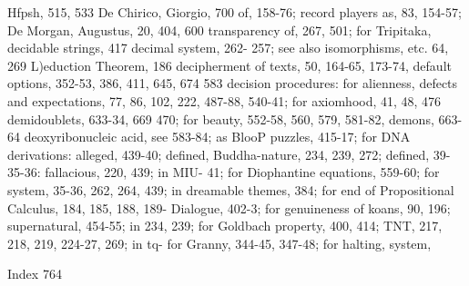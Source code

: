 Hfpsh, 515, 533 De Chirico, Giorgio, 700       of, 158-76; record players as, 83, 154-57;
De Morgan, Augustus, 20, 404, 600              transparency of, 267, 501; for Tripitaka,
decidable strings, 417 decimal system, 262-    257; see also isomorphisms, etc.
64, 269                                        L)eduction Theorem, 186
decipherment of texts, 50, 164-65, 173-74,     default options, 352-53, 386, 411, 645, 674
583 decision procedures: for alienness,        defects and expectations, 77, 86, 102, 222,
487-88, 540-41; for axiomhood, 41, 48,         476 demidoublets, 633-34, 669
470; for beauty, 552-58, 560, 579, 581-82,     demons, 663-64 deoxyribonucleic acid, see
583-84; as BlooP puzzles, 415-17; for          DNA derivations: alleged, 439-40; defined,
Buddha-nature, 234, 239, 272; defined, 39-     35-36: fallacious, 220, 439; in MIU-
41; for Diophantine equations, 559-60; for     system, 35-36, 262, 264, 439; in
dreamable themes, 384; for end of              Propositional Calculus, 184, 185, 188, 189-
Dialogue, 402-3; for genuineness of koans,     90, 196; supernatural, 454-55; in
234, 239; for Goldbach property, 400, 414;     TNT, 217, 218, 219, 224-27, 269; in tq-
for Granny, 344-45, 347-48; for halting,       system,



Index                                                                                    764


